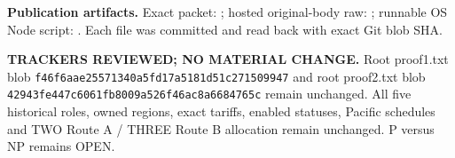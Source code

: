 \documentclass[11pt]{article}
\begin{document}
\par
\textbf{Publication artifacts.} Exact packet: ; hosted original-body raw: ; runnable OS Node script: . Each file was committed and read back with exact Git blob SHA.
\par
\textbf{TRACKERS REVIEWED; NO MATERIAL CHANGE.} Root proof1.txt blob \texttt{f46f6aae25571340a5fd17a5181d51c271509947} and root proof2.txt blob \texttt{42943fe447c6061fb8009a526f46ac8a6684765c} remain unchanged. All five historical roles, owned regions, exact tariffs, enabled statuses, Pacific schedules and TWO Route A / THREE Route B allocation remain unchanged. P versus NP remains OPEN.
\end{document}
